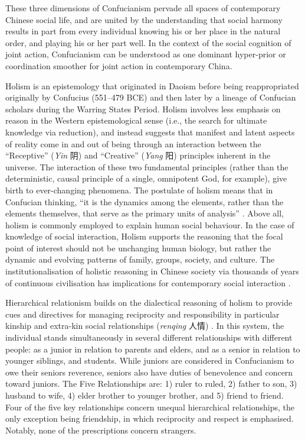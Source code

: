 \begin{CJK}{UTF8}{gbsn}
These three dimensions of Confucianism pervade all spaces of contemporary Chinese social life, and are united by the understanding that social harmony results in part from every individual knowing his or her place in the natural order, and playing his or her part well.  In the context of the social cognition of joint action, Confucianism can be understood as one dominant hyper-prior or coordination smoother for joint action in contemporary China.


Holism is an epistemology that originated in Daoism before being reappropriated originally by Confucius (551–479 BCE) and then later by a lineage of Confucian scholars during the Warring States Period.  Holism involves less emphasis on reason in the Western epistemological sense (i.e., the search for ultimate knowledge via reduction), and instead suggests that manifest and latent aspects of reality come in and out of being through an interaction between the ``Receptive'' (\textit{Yin} 阴) and ``Creative'' (\textit{Yang} 阳) principles inherent in the universe.  The interaction of these two fundamental principles (rather than the deterministic, causal principle of a single, omnipotent God, for example), give birth to ever-changing phenomena.  The postulate of holism means that in Confucian thinking, ``it is the dynamics among the elements, rather than the elements themselves, that serve as the primary units of analysis'' \citep[156]{Ji2010}. Above all, holism is commonly employed to explain human social behaviour.  In the case of knowledge of social interaction, Holism supports the reasoning that the focal point of interest should not be unchanging human biology, but rather the dynamic and evolving patterns of family, groups, society, and culture.  The institutionalisation of holistic reasoning in Chinese society via thousands of years of continuous civilisation has implications for contemporary social interaction \cite{Nisbett2003}.



Hierarchical relationism builds on the dialectical reasoning of holism to provide cues and directives for managing reciprocity and responsibility in particular kinship and extra-kin social relationships (\textit{renqing} 人情) \citep{Maehr1980}.  In this system, the individual stands simultaneously in several different relationships with different people: as a junior in relation to parents and elders, and as a senior in relation to younger siblings, and students. While juniors are considered in Confucianism to owe their seniors reverence, seniors also have duties of benevolence and concern toward juniors. The Five Relationships are: 1) ruler to ruled, 2) father to son, 3) husband to wife, 4) elder brother to younger brother, and 5) friend to friend. Four of the five key relationships concern unequal hierarchical relationships, the only exception being friendship, in which reciprocity and respect is emphasised.  Notably, none of the prescriptions concern strangers.


\end{CJK}
